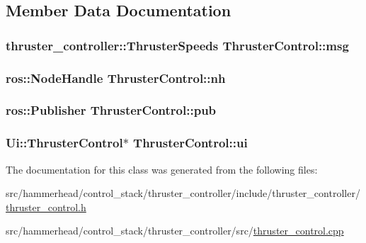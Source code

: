 \subsection{Member Data Documentation}
\subsubsection[{\texorpdfstring{msg}{msg}}]{\setlength{\rightskip}{0pt plus 5cm}thruster\+\_\+controller\+::\+Thruster\+Speeds Thruster\+Control\+::msg\hspace{0.3cm}{\ttfamily [private]}}\hypertarget{classThrusterControl_a70599279984964220a5612e4962814b2}{}\label{classThrusterControl_a70599279984964220a5612e4962814b2}
\subsubsection[{\texorpdfstring{nh}{nh}}]{\setlength{\rightskip}{0pt plus 5cm}ros\+::\+Node\+Handle Thruster\+Control\+::nh\hspace{0.3cm}{\ttfamily [private]}}\hypertarget{classThrusterControl_addb2fe623a853b5a338a6cd5554261ca}{}\label{classThrusterControl_addb2fe623a853b5a338a6cd5554261ca}
\subsubsection[{\texorpdfstring{pub}{pub}}]{\setlength{\rightskip}{0pt plus 5cm}ros\+::\+Publisher Thruster\+Control\+::pub\hspace{0.3cm}{\ttfamily [private]}}\hypertarget{classThrusterControl_a930801a24cc1373018245239f2eba529}{}\label{classThrusterControl_a930801a24cc1373018245239f2eba529}
\subsubsection[{\texorpdfstring{ui}{ui}}]{\setlength{\rightskip}{0pt plus 5cm}Ui\+::\+Thruster\+Control$\ast$ Thruster\+Control\+::ui\hspace{0.3cm}{\ttfamily [private]}}\hypertarget{classThrusterControl_aacfb61a878a7d29e3ccf61c63a463d3f}{}\label{classThrusterControl_aacfb61a878a7d29e3ccf61c63a463d3f}


The documentation for this class was generated from the following files\+:\begin{DoxyCompactItemize}
\item 
src/hammerhead/control\+\_\+stack/thruster\+\_\+controller/include/thruster\+\_\+controller/\hyperlink{thruster__control_8h}{thruster\+\_\+control.\+h}\item 
src/hammerhead/control\+\_\+stack/thruster\+\_\+controller/src/\hyperlink{thruster__control_8cpp}{thruster\+\_\+control.\+cpp}\end{DoxyCompactItemize}
